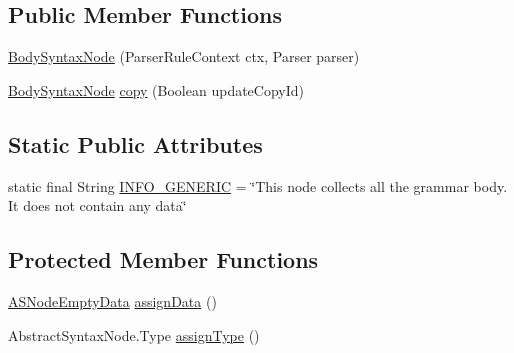 \subsection*{Public Member Functions}
\begin{DoxyCompactItemize}
\item 
\hyperlink{classit_1_1emarolab_1_1cagg_1_1core_1_1language_1_1syntax_1_1abstractTree_1_1syntaxNodeType_1_1BodySyntaxNode_af57411728fec95c1f3fc7ccfe102f3fd}{Body\-Syntax\-Node} (Parser\-Rule\-Context ctx, Parser parser)
\item 
\hyperlink{classit_1_1emarolab_1_1cagg_1_1core_1_1language_1_1syntax_1_1abstractTree_1_1syntaxNodeType_1_1BodySyntaxNode}{Body\-Syntax\-Node} \hyperlink{classit_1_1emarolab_1_1cagg_1_1core_1_1language_1_1syntax_1_1abstractTree_1_1syntaxNodeType_1_1BodySyntaxNode_aa0753f29779b2625dbbc8a0bddc86e0d}{copy} (Boolean update\-Copy\-Id)
\end{DoxyCompactItemize}
\subsection*{Static Public Attributes}
\begin{DoxyCompactItemize}
\item 
static final String \hyperlink{classit_1_1emarolab_1_1cagg_1_1core_1_1language_1_1syntax_1_1abstractTree_1_1syntaxNodeType_1_1BodySyntaxNode_a4a74dce388f4c728728cba4adb72b3a7}{I\-N\-F\-O\-\_\-\-G\-E\-N\-E\-R\-I\-C} = \char`\"{}This node collects all the grammar body. It does not contain any data\char`\"{}
\end{DoxyCompactItemize}
\subsection*{Protected Member Functions}
\begin{DoxyCompactItemize}
\item 
\hyperlink{classit_1_1emarolab_1_1cagg_1_1core_1_1language_1_1syntax_1_1abstractTree_1_1AbstractDataFactory_1_1ASNodeEmptyData}{A\-S\-Node\-Empty\-Data} \hyperlink{classit_1_1emarolab_1_1cagg_1_1core_1_1language_1_1syntax_1_1abstractTree_1_1syntaxNodeType_1_1BodySyntaxNode_a4b04db90aab15a5dae4fd6ff6bc8a492}{assign\-Data} ()
\item 
Abstract\-Syntax\-Node.\-Type \hyperlink{classit_1_1emarolab_1_1cagg_1_1core_1_1language_1_1syntax_1_1abstractTree_1_1syntaxNodeType_1_1BodySyntaxNode_ab7566d4c26b48a4b8fa726aa799f0a32}{assign\-Type} ()
\end{DoxyCompactItemize}


